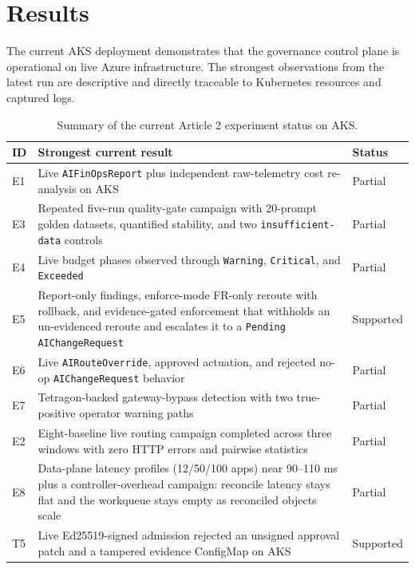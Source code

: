 \section{Results}
\label{sec:results}
The current AKS deployment demonstrates that the governance control plane is operational on live Azure infrastructure. The strongest observations from the latest run are descriptive and directly traceable to Kubernetes resources and captured logs.

\begin{table}[t]
\centering
\small
\begin{tabular}{p{1.2cm} p{7.0cm} p{2.4cm}}
\toprule
ID & Strongest current result & Status \\
\midrule
E1 & Live \texttt{AIFinOpsReport} plus independent raw-telemetry cost re-analysis on AKS & Partial \\
E3 & Repeated five-run quality-gate campaign with 20-prompt golden datasets, quantified stability, and two \texttt{insufficient-data} controls & Partial \\
E4 & Live budget phases observed through \texttt{Warning}, \texttt{Critical}, and \texttt{Exceeded} & Partial \\
E5 & Report-only findings, enforce-mode FR-only reroute with rollback, and evidence-gated enforcement that withholds an un-evidenced reroute and escalates it to a \texttt{Pending} \texttt{AIChangeRequest} & Supported \\
E6 & Live \texttt{AIRouteOverride}, approved actuation, and rejected no-op \texttt{AIChangeRequest} behavior & Partial \\
E7 & Tetragon-backed gateway-bypass detection with two true-positive operator warning paths & Partial \\
E2 & Eight-baseline live routing campaign completed across three windows with zero HTTP errors and pairwise statistics & Partial \\
E8 & Data-plane latency profiles (12/50/100 apps) near 90--110 ms plus a controller-overhead campaign: reconcile latency stays flat and the workqueue stays empty as reconciled objects scale & Partial \\
T5 & Live Ed25519-signed admission rejected an unsigned approval patch and a tampered evidence ConfigMap on AKS & Supported \\
\bottomrule
\end{tabular}
\caption{Summary of the current Article 2 experiment status on AKS.}
\end{table}

